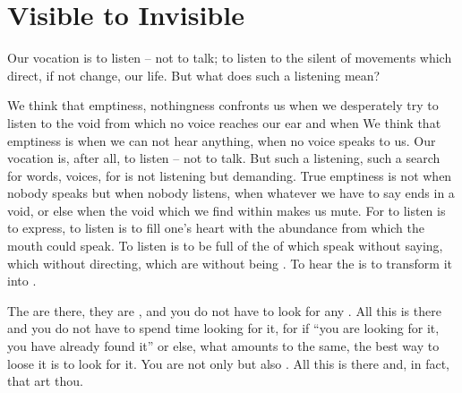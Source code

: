 
\section{Visible to Invisible}
%

\pa 
Our vocation is to listen -- not to talk; to listen to the silent 
 of  movements which direct, if not 
change, our life. But what does such a listening mean?


We think that emptiness, nothingness confronts us when we
desperately try to listen to the void from which no voice reaches our
ear and when 
We think that emptiness is when we can not hear anything, when
no voice speaks to us.  Our vocation is, after all, to listen -- not
to talk.  But such a listening, such a search for words, voices, for
 is not listening but demanding.  True emptiness is
not when nobody speaks but when nobody listens, when whatever we have
to say ends in a void, or else when the void which we find within 
makes us mute. For to listen is to express, to listen is to
fill one's heart with the abundance from which the mouth could speak. 
To listen is to be full of the  of  which
speak without saying, which  without directing, which are
 without being .  
To hear the  is to transform it into .

The  are there, they are , and you do not
have to look for any .  All this is there and you do
not have to spend time looking for it, for if ``you are looking for
it, you have already found it'' or else, what amounts to the same, the
best way to loose it is to look for it.  You are not only
 but also .  All this is there and, in
fact, that art thou.


